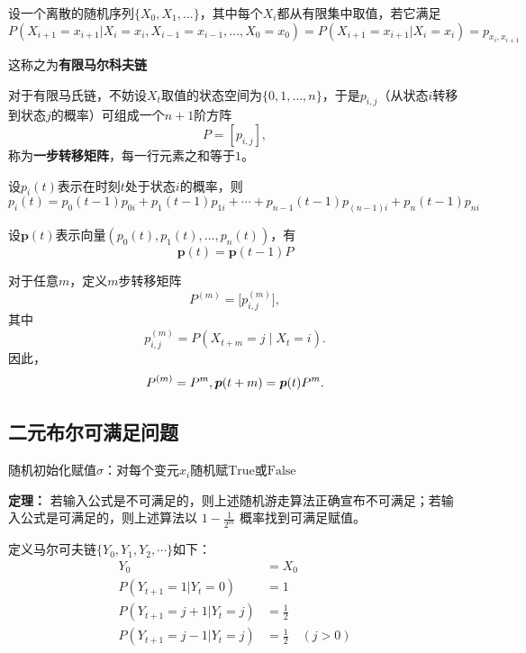 \documentclass[./../main.tex]{subfiles} %
\begin{document}
设一个离散的随机序列$\{X_0, X_1, ...\}$，其中每个$X_i$都从有限集中取值，若它满足
$$
P(X_{i+1}=x_{i+1}|X_i=x_i,X_{i-1}=x_{i-1},...,X_0=x_0)=P(X_{i+1}=x_{i+1}|X_i=x_i)=p_{x_i, x_{i+1}}
$$

这称之为\textbf{有限马尔科夫链}

对于有限马氏链，不妨设$X_t$取值的状态空间为$\{0,1,\ldots,n\}$，于是$p_{i,j}$（从状态$i$转移到状态$j$的概率）可组成一个$n+1$阶方阵
$$
P = [p_{i,j}],
$$
称为\textbf{一步转移矩阵}，每一行元素之和等于$1$。

设$p_i(t)$表示在时刻$t$处于状态$i$的概率，则
$$
p_i(t) = p_0(t-1)p_{0i} + p_1(t-1)p_{1i} + \cdots + p_{n-1}(t-1)p_{(n-1)i} + p_n(t-1)p_{ni}
$$

设$\boldsymbol{p}(t)$表示向量$(p_0(t), p_1(t), \ldots, p_n(t))$，有
$$
\boldsymbol{p}(t) = \boldsymbol{p}(t-1)P
$$

对于任意$m$，定义$m$步转移矩阵
$$
P^{(m)} = \big[p_{i,j}^{(m)}\big],
$$
其中
$$
p_{i,j}^{(m)} = P(X_{t + m} = j \mid X_t = i).
$$
因此，
$$
P^{(m)} = P^m,\\
\boldsymbol{p}(t + m) = \boldsymbol{p}(t) P^{m}.
$$

\subsection{二元布尔可满足问题}

\begin{algorithm}[H]
\SetAlgoLined
{}
\BlankLine
随机初始化赋值$\sigma$：对每个变元$x_i$随机赋$\text{True}$或$\text{False}$\;
 
\caption{2-SAT随机局部搜索算法}
\end{algorithm}

\noindent\textbf{定理：} 若输入公式是不可满足的，则上述随机游走算法正确宣布不可满足；若输入公式是可满足的，则上述算法以 $1-\frac{1}{2^m}$ 概率找到可满足赋值。

定义马尔可夫链$\{Y_0,Y_1,Y_2,\cdots\}$如下：
\begin{align*}
Y_0 &= X_0 \\
P(Y_{t+1}=1|Y_t=0) &= 1 \\
P(Y_{t+1}=j+1|Y_t=j) &= \frac{1}{2} \\
P(Y_{t+1}=j-1|Y_t=j) &= \frac{1}{2} \quad (j > 0)
\end{align*}
\end{document}
